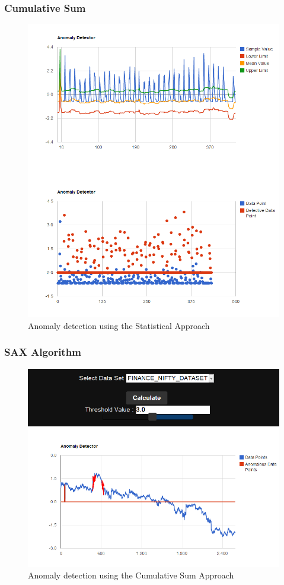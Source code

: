 \documentclass[12pt]{report}
\begin{document}
\subsubsection{Cumulative Sum}
\begin{figure}[h!]

  \centering
    \includegraphics[scale=0.5]{./screenshots/result_ano_stat.png}
  \caption{Anomaly detection using the Statistical Approach}
\end{figure}
\subsubsection{SAX Algorithm }
\begin{figure}[h!]

  \centering
    \includegraphics[scale=0.5]{./screenshots/result_ano_cusum.png}
  \caption{Anomaly detection using the Cumulative Sum Approach}
\end{figure}
\end{document}
